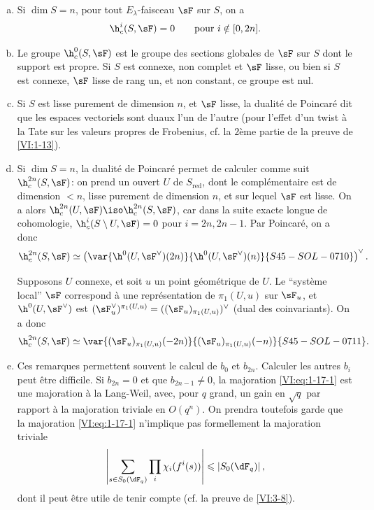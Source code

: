 \begin{enumerate}[a)]
  \item Si $\dim S=n$, pour tout $E_\lambda$-faisceau $\sF$ sur $S$, on a 
    \[
      \h_c^i(S,\sF) = 0 \qquad \text{pour $i\notin [0,2n]$.}
    \]
  \item Le groupe $\h_c^0(S,\sF)$ est le groupe des sections globales de $\sF$ 
    sur $S$ dont le support est propre. Si $S$ est connexe, non complet et 
    $\sF$ lisse, ou bien si $S$ est connexe, $\sF$ lisse de rang un, et non 
    constant, ce groupe est nul.
  \item Si $S$ est lisse purement de dimension $n$, et $\sF$ lisse, la 
    dualité de Poincaré dit que les espaces vectoriels 
     sont duaux l'un de l'autre 
    (pour l'effet d'un twist à la Tate sur les valeurs propres de Frobenius, 
    cf. la $2$ème partie de la preuve de \ref{VI:1-13}).
  \item Si $\dim S=n$, la dualité de Poincaré permet de calculer comme 
    suit $\h_c^{2n}(S,\sF)$: on prend un ouvert $U$ de $S_\text{red}$, dont le 
    complémentaire est de dimension $<n$, lisse purement de dimension $n$, et 
    sur lequel $\sF$ est lisse. On a alors 
    $\h_c^{2n}(U,\sF) \iso \h_c^{2n}(S,\sF)$, car dans la suite exacte longue 
    de cohomologie, $\h_c^i(S\setminus U,\sF) = 0$ pour $i=2n,2n-1$. Par 
    Poincaré, on a donc 
    \[
      \h_c^{2n}(S,\sF) \simeq \left(\var{\h^0(U,\sF^\vee)(2n)}{\h^0(U,\sF^\vee)(n)}{S45-SOL-0710}\right)^\vee \text{.}
    \]
    
    Supposons $U$ connexe, et soit $u$ un point géométrique de $U$. Le 
    ``système local'' $\sF$ correspond à une représentation de 
    $\pi_1(U,u)$ sur $\sF_u$, et $\h^0(U,\sF^\vee)$ est 
    $(\sF_u^\vee)^{\pi_1(U,u)}=((\sF_u)_{\pi_1(U,u)})^\vee$ (dual des 
    coinvariants). On a donc 
\[
      \h_c^{2n}(S,\sF) \simeq \var{(\sF_u)_{\pi_1(U,u)}(-2n)}{(\sF_u)_{\pi_1(U,u)}(-n)}{S45-SOL-0711} \text{.}
    \]
  \item Ces remarques permettent souvent le calcul de $b_0$ et $b_{2n}$. 
    Calculer les autres $b_i$ peut être difficile. Si $b_{2n}=0$ et que 
    $b_{2n-1}\ne 0$, la majoration \eqref{VI:eq:1-17-1} est une majoration à la 
    Lang-Weil, avec, pour $q$ grand, un gain en $\sqrt q$ par rapport à la 
    majoration triviale en $O(q^n)$. On prendra toutefois garde que la 
    majoration \eqref{VI:eq:1-17-1} n'implique pas formellement la majoration 
    triviale 
    \[
      \left|\sum_{s\in S_0(\dF_q)} \prod_i \chi_i(f^i(s))\right| \leqslant \left| S_0(\dF_q)\right| \text{,}
    \]
    dont il peut être utile de tenir compte (cf. la preuve de \ref{VI:3-8}). 
\end{enumerate}

